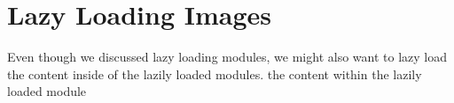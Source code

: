 \chapter{ Lazy Loading Images }

Even though we discussed lazy loading modules, we might also want to lazy load the content
inside of the lazily loaded modules. 
the content within the lazily loaded module 
